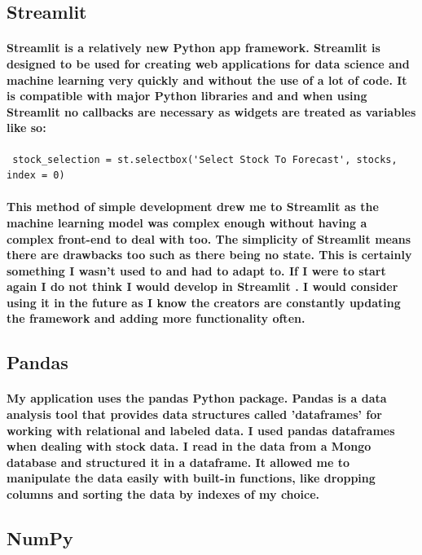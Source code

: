 \subsection{Streamlit}
\paragraph{Streamlit is a relatively new Python app framework. Streamlit is designed to be used for creating web applications for data science and machine learning very quickly and without the use of a lot of code. It is compatible with major Python libraries and and when using Streamlit no callbacks are necessary as widgets are treated as variables like so:}

\begin{verbatim}
 stock_selection = st.selectbox('Select Stock To Forecast', stocks, index = 0)
 \end{verbatim}
 
 \paragraph{This method of simple development drew me to Streamlit as the machine learning model was complex enough without having a complex front-end to deal with too. The simplicity of Streamlit means there are drawbacks too such as there being no state. This is certainly something I wasn't used to and had to adapt to. If I were to start again I do not think I would develop in Streamlit . I would consider using it in the future as I know the creators are constantly updating the framework and adding more functionality often.}

\subsection{Pandas}
\paragraph{My application uses the pandas Python package. Pandas is a data analysis tool that provides data structures called 'dataframes' for working with relational and labeled data. I used pandas dataframes when dealing with stock data. I read in the data from a Mongo database and structured it in a dataframe. It allowed me to manipulate the data easily with built-in functions, like dropping columns and sorting the data by indexes of my choice.}

\subsection{NumPy}
